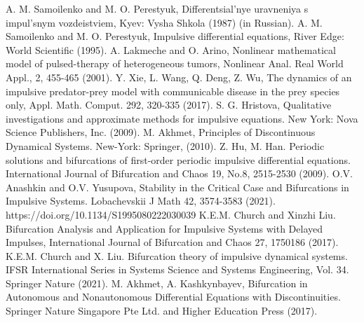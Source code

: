 \documentclass[12pt]{article}
\begin{document}
\begin{thebibliography}{99}
A. M. Samoilenko and M. O. Perestyuk,
Differentsial'nye uravneniya s impul'snym vozdeistviem, Kyev: Vysha Shkola (1987) (in Russian).
A. M. Samoilenko and M. O. Perestyuk,
Impulsive differential equations, River Edge: World Scientific (1995).
A. Lakmeche and O. Arino, Nonlinear mathematical model of pulsed-therapy of heterogeneous
tumors, Nonlinear Anal. Real World Appl., {2}, 455-465 (2001).
Y. Xie, L. Wang, Q. Deng, Z. Wu,  The dynamics of an impulsive predator-prey model with communicable disease in the prey species only, Appl. Math. Comput. 292, 320-335 (2017).
S. G. Hristova, 
Qualitative investigations and approximate methods for impulsive equations. New York: Nova Science Publishers, Inc. (2009).
M. Akhmet, Principles of Discontinuous Dynamical Systems. New-York: Springer, (2010).
Z. Hu, M. Han.
Periodic solutions and bifurcations of first-order periodic impulsive differential equations.
International Journal of Bifurcation and Chaos 19, No.8, 2515-2530 (2009).
O.V. Anashkin and O.V. Yusupova, Stability in the Critical Case and Bifurcations in Impulsive Systems. Lobachevskii J Math 42, 3574-3583 (2021). https://doi.org/10.1134/S1995080222030039
K.E.M. Church and Xinzhi Liu.
Bifurcation Analysis and Application for Impulsive Systems with Delayed Impulses, International Journal of Bifurcation and Chaos {27},  1750186 (2017).
K.E.M. Church and X. Liu. Bifurcation theory of impulsive dynamical systems. IFSR
International Series in Systems Science and Systems Engineering, Vol. 34. Springer
Nature (2021).
M. Akhmet, A. Kashkynbayev,
Bifurcation in Autonomous and Nonautonomous
Differential Equations with Discontinuities.
Springer Nature Singapore Pte Ltd. and Higher Education Press (2017).

\end{thebibliography}
\end{document}
